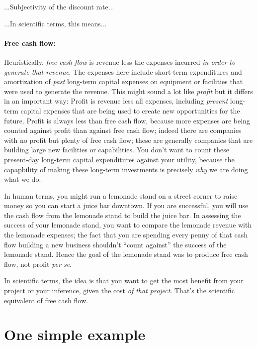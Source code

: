 \documentclass[12pt,twoside,pdftex]{article}
\begin{document}
...Subjectivity of the discount rate...

...In scientific terms, this means...

\paragraph{Free cash flow:}
Heuristically, \emph{free cash flow} is revenue less the expenses
incurred \emph{in order to generate that revenue}.  The expenses here
include short-term expenditures and amortization of \emph{past}
long-term capital expenses on equipment or facilities that were used
to generate the revenue.  This might sound a lot like \emph{profit}
but it differs in an important way: Profit is revenue less all
expenses, including \emph{present} long-term capital expenses that are
being used to create new opportunities for the future.  Profit is
always less than free cash flow, because more expenses are being
counted against profit than against free cash flow; indeed there are
companies with no profit but plenty of free cash flow; these are
generally companies that are building large new facilities or
capabilities.  You don't want to count these present-day long-term
capital expenditures against your utility, because the capapbility of
making these long-term investments is precisely \emph{why} we are
doing what we do.

In human terms, you might run a lemonade stand on a street corner to
raise money so you can start a juice bar downtown.  If you are
successful, you will use the cash flow from the lemonade stand to
build the juice bar.  In assessing the success of your lemonade stand,
you want to compare the lemonade revenue with the lemonade expenses;
the fact that you are spending every penny of that cash flow building
a new business shouldn't ``count against'' the success of the lemonade
stand.  Hence the goal of the lemonade stand was to produce free cash
flow, not profit \emph{per se}.

In scientific terms, the idea is that you want to get the most benefit
from your project or your inference, given the cost \emph{of that
  project}.  That's the scientific equivalent of free cash flow.

\section{One simple example}
\end{document}

